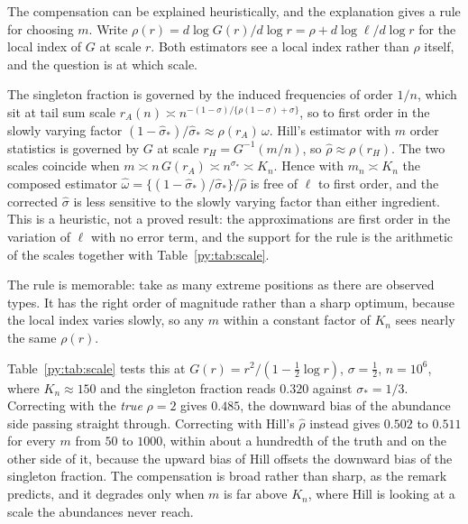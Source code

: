 The compensation can be explained heuristically, and the explanation gives a rule for choosing $m$. Write
$\rho(r) = d\log G(r)/d\log r = \rho + d\log\ell/d\log r$ for the local index of $G$ at scale $r$.
Both estimators see a local index rather than $\rho$ itself, and the question is at which scale.

\begin{remark}
\label{py:rem:scale}
The singleton fraction is governed by the induced frequencies of order $1/n$, which sit at tail sum
scale $r_A(n) \asymp n^{-(1-\sigma)/\{\rho(1-\sigma)+\sigma\}}$, so to first order in the slowly
varying factor $(1-\hat\sigma_*)/\hat\sigma_* \approx \rho(r_A)\,\omega$. Hill's estimator with $m$
order statistics is governed by $G$ at scale $r_H = G^{-1}(m/n)$, so $\hat\rho \approx \rho(r_H)$.
The two scales coincide when $m \asymp n\,G(r_A) \asymp n^{\sigma_*} \asymp K_n$. Hence with
$m_n \asymp K_n$ the composed estimator $\hat\omega = \{(1-\hat\sigma_*)/\hat\sigma_*\}/\hat\rho$ is
free of $\ell$ to first order, and the corrected $\hat\sigma$ is less sensitive to the slowly
varying factor than either ingredient. This is a heuristic, not a proved result: the approximations are first order in the variation of $\ell$ with no error term, and the support for the rule is the arithmetic of the scales together with Table~\ref{py:tab:scale}.
\end{remark}

The rule is memorable: take as many extreme positions as there are observed types. It has the right
order of magnitude rather than a sharp optimum, because the local index varies slowly, so any $m$
within a constant factor of $K_n$ sees nearly the same $\rho(r)$.

Table~\ref{py:tab:scale} tests this at $G(r) = r^{2}/(1-\tfrac12\log r)$, $\sigma = \tfrac12$,
$n = 10^{6}$, where $K_n \approx 150$ and the singleton fraction reads $0.320$ against
$\sigma_* = 1/3$. Correcting with the \emph{true} $\rho = 2$ gives $0.485$, the downward bias of the
abundance side passing straight through. Correcting with Hill's $\hat\rho$ instead gives $0.502$ to
$0.511$ for every $m$ from $50$ to $1000$, within about a hundredth of the truth and on the other side of
it, because the upward bias of Hill offsets the downward bias of the singleton fraction. The
compensation is broad rather than sharp, as the remark predicts, and it degrades only when
$m$ is far above $K_n$, where Hill is looking at a scale the abundances never reach.


